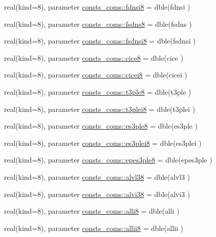 \begin{DoxyCompactItemize}
\item 
real(kind=8), parameter \hyperlink{namespaceconsts__coms_a04cf1d11e9425210216c51d7e79c9ecb}{consts\+\_\+coms\+::fdnsi8} = dble(fdnsi )
\item 
real(kind=8), parameter \hyperlink{namespaceconsts__coms_aa54f1d2828bd67a238029a4f20458937}{consts\+\_\+coms\+::fsdns8} = dble(fsdns )
\item 
real(kind=8), parameter \hyperlink{namespaceconsts__coms_a1d3aceb39f9cba756c3b95e2e6a81f6e}{consts\+\_\+coms\+::fsdnsi8} = dble(fsdnsi )
\item 
real(kind=8), parameter \hyperlink{namespaceconsts__coms_a668f0c857a96c3f20e06c950a68910c0}{consts\+\_\+coms\+::cice8} = dble(cice )
\item 
real(kind=8), parameter \hyperlink{namespaceconsts__coms_aa60b50b0db15afc52c7ac27b9134ac7e}{consts\+\_\+coms\+::cicei8} = dble(cicei )
\item 
real(kind=8), parameter \hyperlink{namespaceconsts__coms_a8b9e935024ff53349885cfe5e3259de3}{consts\+\_\+coms\+::t3ple8} = dble(t3ple )
\item 
real(kind=8), parameter \hyperlink{namespaceconsts__coms_a9a4f83fc2d002ec3752516d7626b28c7}{consts\+\_\+coms\+::t3plei8} = dble(t3plei )
\item 
real(kind=8), parameter \hyperlink{namespaceconsts__coms_a0296d1fa8ac9a5b8469ab8cc28dc0b1c}{consts\+\_\+coms\+::es3ple8} = dble(es3ple )
\item 
real(kind=8), parameter \hyperlink{namespaceconsts__coms_aca52530455d0c1b8063f2f30a3366291}{consts\+\_\+coms\+::es3plei8} = dble(es3plei )
\item 
real(kind=8), parameter \hyperlink{namespaceconsts__coms_aab17990b5af5fd6746fc4465af9394ba}{consts\+\_\+coms\+::epes3ple8} = dble(epes3ple )
\item 
real(kind=8), parameter \hyperlink{namespaceconsts__coms_a975fb046d5ee7ab5b6b9cef9f840808d}{consts\+\_\+coms\+::alvl38} = dble(alvl3 )
\item 
real(kind=8), parameter \hyperlink{namespaceconsts__coms_a93d2577c7a09eea29f032257a759bef3}{consts\+\_\+coms\+::alvi38} = dble(alvi3 )
\item 
real(kind=8), parameter \hyperlink{namespaceconsts__coms_acc1b8962e7dd43281926417aa95561f7}{consts\+\_\+coms\+::alli8} = dble(alli )
\item 
real(kind=8), parameter \hyperlink{namespaceconsts__coms_a0d860a9c3e3614a0129bb0eeb22387e6}{consts\+\_\+coms\+::allii8} = dble(allii )
\item 

\end{DoxyCompactItemize}
